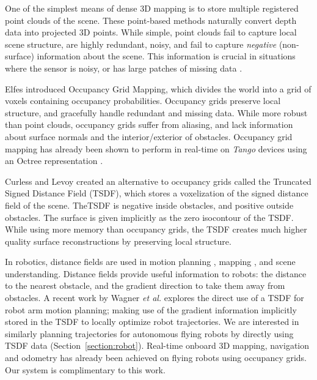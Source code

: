 \documentclass[conference]{IEEEtran}
\newcommand{\sref}[1]{Section~\ref{#1}}
\newcommand{\etal}{\textit{et al. }}
\newcommand{\Tango}{\textit{Tango} }
\begin{document}
One of the simplest means of dense 3D mapping is to  store multiple registered
point clouds of the scene. These point-based methods \cite{RusinkiewiczPoints,
TanskanenMetric, WeiseScanning, LSDSlam} naturally convert depth data into
projected 3D points. While simple, point clouds fail to capture local scene structure, are
highly redundant, noisy, and fail to capture \emph{negative} (non-surface)
information about the scene. This information is crucial in situations where the sensor is noisy,
or has large patches of missing data \cite{Klingensmith2014}.

Elfes \cite{Elfes1989} introduced Occupancy Grid Mapping, which divides the
world into a grid of voxels containing occupancy probabilities. Occupancy grids
preserve local structure, and gracefully handle redundant and missing data.  
While more robust than point clouds, occupancy grids suffer from aliasing, and
lack information about surface normals and the interior/exterior of obstacles. 
Occupancy grid mapping has already been shown to perform in real-time on \Tango
\cite{Tango} devices using an Octree representation \cite{Wurm2010}.


Curless and Levoy \cite{Curless1996} created an alternative to occupancy
grids called the Truncated Signed Distance Field (TSDF), which stores a
voxelization of the signed distance field of the scene. TheTSDF is negative
inside obstacles, and positive outside obstacles. The surface is given
implicitly as the zero isocontour of the TSDF. While using more memory
than occupancy grids, the TSDF creates much higher quality surface
reconstructions by preserving local structure.

In robotics, distance fields are used in motion planning
\cite{RatliffChomp}, mapping \cite{VandapelKA05}, and scene understanding.
Distance fields provide useful information to robots: the distance to the
nearest obstacle, and the gradient direction to take them away from obstacles. 
A recent work by Wagner \etal \cite{WagnerICRA13} explores the direct use of a
TSDF for robot arm motion planning; making use of the gradient information
implicitly stored in the TSDF to locally optimize robot trajectories. We are
interested in similarly planning trajectories for autonomous flying robots by
directly using TSDF data (\sref{section:robot}). Real-time onboard 3D mapping,
navigation and odometry has already been achieved on flying robots
\cite{FlyingNavigation, OSMAV}using occupancy grids. Our system is complimentary to this
work.
\end{document}
